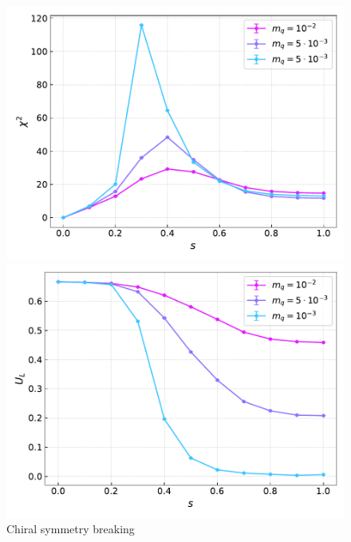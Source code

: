 \begin{figure}[h]
\begin{minipage}{0.45\textwidth}
	\includegraphics[scale=0.48]{figures/chiral_PT/chi2.pdf}
\end{minipage}
\hfill
\begin{minipage}{0.45\textwidth}
	\includegraphics[scale=0.48]{figures/chiral_PT/binder.pdf}
\end{minipage}
\hfill
\caption{Chiral symmetry breaking}
\label{fig:chiral:symmetry_breaking}
\end{figure}


